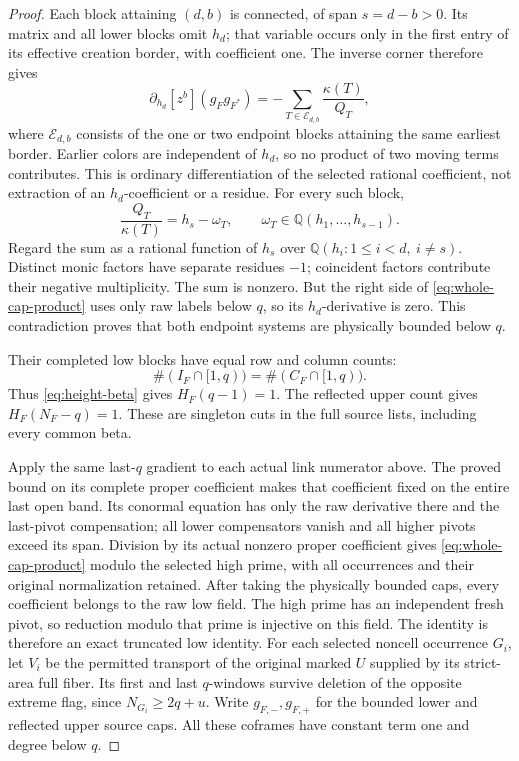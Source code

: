 \documentclass[11pt,a4paper]{amsart}
\numberwithin{equation}{section}
\theoremstyle{plain}
\theoremstyle{definition}
\newcommand{\Q}{\mathbb Q}
\begin{document}
\begin{proof}
Each block attaining \((d,b)\) is connected, of span \(s=d-b>0\).
Its matrix and all lower blocks omit \(h_d\); that variable occurs
only in the first entry of its effective creation border, with
coefficient one.  The inverse corner therefore gives
\[
 \partial_{h_d}[z^b](g_Fg_{F^*})
   =-\sum_{T\in\mathcal E_{d,b}}\frac{\kappa(T)}{Q_T},
\]
where \(\mathcal E_{d,b}\) consists of the one or two endpoint blocks
attaining the same earliest border.  Earlier colors are independent
of \(h_d\), so no product of two moving terms contributes.
This is ordinary differentiation of the selected rational
coefficient, not extraction of an \(h_d\)-coefficient or a residue.
For every such block,
\[
 \frac{Q_T}{\kappa(T)}=h_s-\omega_T,\qquad
 \omega_T\in\Q(h_1,\ldots,h_{s-1}).
\]
Regard the sum as a rational function of \(h_s\) over
\(\Q(h_i:1\le i<d,\ i\ne s)\).
Distinct monic factors have separate residues \(-1\); coincident
factors contribute their negative multiplicity.  The sum is
nonzero.  But the right side of \eqref{eq:whole-cap-product} uses
only raw labels below \(q\), so its \(h_d\)-derivative is zero.
This contradiction proves that both endpoint systems are physically
bounded below \(q\).

Their completed low blocks have equal row and column counts:
\[
 \#(I_F\cap[1,q))=\#(C_F\cap[1,q)).
\]
Thus \eqref{eq:height-beta} gives \(H_F(q-1)=1\).
The reflected upper count gives \(H_F(N_F-q)=1\).
These are singleton cuts in the full source lists, including every
common beta.

Apply the same last-\(q\) gradient to each actual link numerator above.
The proved bound on its complete proper coefficient makes that
coefficient fixed on the entire last open band.  Its conormal equation
has only the raw derivative there and the last-pivot compensation;
all lower compensators vanish and all higher pivots exceed its span.
Division by its actual nonzero proper coefficient gives
\eqref{eq:whole-cap-product} modulo the selected high prime, with all
occurrences and their original normalization retained.  After taking
the physically bounded caps, every coefficient belongs to the raw low
field.  The high prime has an independent fresh pivot, so reduction
modulo that prime is injective on this field.  The identity is therefore
an exact truncated low identity.
For each selected noncell occurrence \(G_i\), let \(V_i\) be the
permitted transport of the original marked \(U\) supplied by its
strict-area full fiber.  Its first and last \(q\)-windows survive
deletion of the opposite extreme flag, since \(N_{G_i}\ge2q+u\).
Write \(g_{F,-},g_{F,+}\) for the bounded lower and reflected upper
source caps.  All these coframes have constant term one and degree
below \(q\).


\end{proof}
\end{document}
